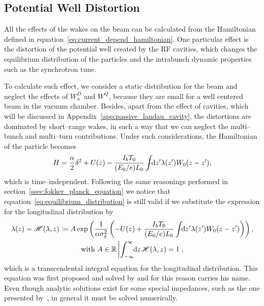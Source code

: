 \subsection{Potential Well Distortion}

    All the effects of the wakes on the beam can be calculated from the Hamiltonian defined in equation~\eqref{eq:current_depend_hamiltonian}. One particular effect is the distortion of the potential well created by the RF cavities, which changes the equilibrium distribution of the particles and the intrabunch dynamic properties such as the synchrotron tune.

    To calculate such effect, we consider a static distribution for the beam and neglect the effects of $W^D_u$ and $W^Q$, because they are small for a well centered beam in the vacuum chamber. Besides, apart from the effect of cavities, which will be discussed in Appendix~\ref{app:passive_landau_cavity}, the distortions are dominated by short--range wakes, in such a way that we can neglect the multi--bunch and multi--turn contributions. Under such considerations, the Hamiltonian of the particle becomes
    \begin{align}
        H = \frac\alpha2\delta^2 + U(z) -
            \frac{I_bT_0}{(E_0/e)L_0}\int\!\!\text{d}z' \lambda(z') W_0(z-z'),
    \end{align}
    which is time--independent. Following the same reasonings performed in section~\ref{ssec:fokker_planck_equation} we notice that equation~\eqref{eq:equilibrium_distribution} is still valid if we substitute the expression for the longitudinal distribution by
    \begin{gather}\label{eq:haissinski_equation}
        \lambda(z) = \mathscr{H}(\lambda,z) \coloneqq A\exp\left(\frac{1}{\alpha\sigma_\delta^2}\left(
            -U(z) + \frac{I_bT_0}{(E_0/e)L_0}\int\!\!\text{d}z' \lambda(z') W_0(z-z')\right)\right),\\\nonumber
            \text{with}\,\,A \in \mathbb{R} \left| \int_{-\infty}^{\infty}\!\!\text{d}z \mathscr{H}(\lambda,z)=1\right.,
    \end{gather}
    which is a transcendental integral equation for the longitudinal distribution. This equation was first proposed and solved by  and for this reason carries his name. Even though analytic solutions exist for some special impedances, such as the one presented by~, in general it must be solved numerically.

